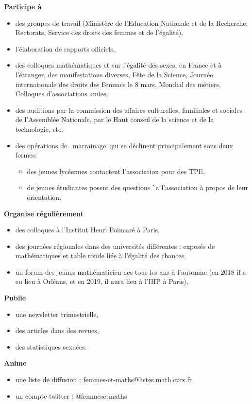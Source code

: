 \textbf{Participe \`a}
\begin{itemize}
\item des groupes de travail (Minist\`ere de l'Education Nationale et de la Recherche, Rectorats, Service des droits des femmes et de l'\'egalit\'e),
\item l'\'elaboration de rapports officiels,
\item des colloques math\'ematiques et sur l'\'egalit\'e des sexes, en France et \`a l'\'etranger,
 des manifestations diverses, F\^ete de la Science, Journ\'ee internationale des droits des Femmes le 8 mars, Mondial des m\'etiers, Colloques d'associations amies,
\item des auditions par la commission des affaires culturelles, familiales et sociales de l'Assembl\'ee Nationale, par le Haut conseil de la science et de la technologie, etc.
\item  des op\'erations de \og\ marrainage\fg\  qui se d\'eclinent principalement sous deux formes:
\begin{itemize}
\item des jeunes lyc\'eennes contactent l'association pour des TPE,
\item de jeunes \'etudiantes posent des questions \``a l'association \`a propos de leur orientation.
\end{itemize}
\end{itemize}
\textbf{Organise r\'eguli\`erement}
\begin{itemize}
\item des colloques \`a l'Institut Henri Poincar\'e \`a Paris,
\item des journ\'ees r\'egionales dans des universit\'es diff\'erentes : expos\'es de math\'ematiques et table ronde li\'ee \`a l'\'egalit\'e des chances,
\item un forum des jeunes math\'ematicien$\cdot$nes tous les ans \`a l'automne (en 2018 il a eu lieu à Orléans, et en 2019, il aura lieu à l'IHP à Paris),
\end{itemize}
\textbf{Publie}
\begin{itemize}
\item une newsletter trimestrielle,
\item des articles dans des revues,
\item des statistiques sexu\'ees.
\end{itemize}
\textbf{Anime}
\begin{itemize}
\item
une liste de diffusion : femmes-et-maths@listes.math.cnrs.fr
\item
un compte twitter : @femmesetmaths
\end{itemize}

